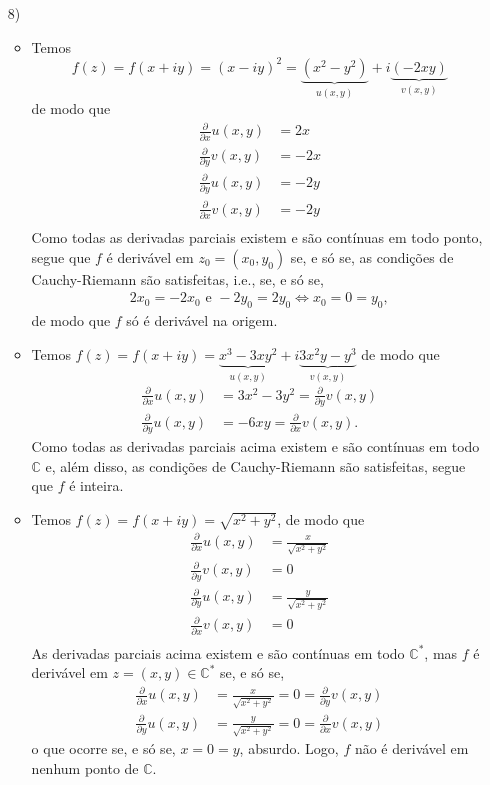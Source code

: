 \documentclass[12pt,a4paper]{article}
\begin{document}
\begin{enumerate}
	\item[8)]
	\begin{itemize}
		\item Temos
		$$
		f(z) = f(x+iy) = (x-iy)^2 = \underbrace{(x^2-y^2)}_{u(x,y)} + i\underbrace{(-2xy)}_{v(x,y)}
		$$
		de modo que
		\begin{align*}
		\frac{\partial}{\partial x}u(x,y) &= 2x \\  
		\frac{\partial}{\partial y}v(x,y) &= -2x \\
		\frac{\partial}{\partial y}u(x,y) &= -2y \\
		\frac{\partial}{\partial x}v(x,y) &= -2y \\
		\end{align*}
		Como todas as derivadas parciais existem e são contínuas em todo ponto, segue que $f$ é derivável em $z_0 = (x_0,y_0)$ se, e só se, as condições de Cauchy-Riemann são satisfeitas, i.e., se, e só se,
		\begin{align*}
		2x_0 = -2x_0 \text{ e } -2y_0=2y_0 \Longleftrightarrow x_0 = 0 = y_0,
		\end{align*}
		de modo que $f$ só é derivável na origem.
		
		\item Temos $f(z) = f(x+iy) = \underbrace{x^3-3xy^2}_{u(x,y)} + i\underbrace{3x^2y-y^3}_{v(x,y)}$
		de modo que
		\begin{align*}
		\frac{\partial}{\partial x}u(x,y) &= 3x^2 - 3y^2 = \frac{\partial}{\partial y}v(x,y) \\
		\frac{\partial}{\partial y}u(x,y) &= -6xy = \frac{\partial}{\partial x}v(x,y).
		\end{align*}
		Como todas as derivadas parciais acima existem e são contínuas em todo $\mathbb{C}$ e, além disso, as condições de Cauchy-Riemann são satisfeitas, segue que $f$ é inteira.
		
		\item Temos $f(z) = f(x+iy) = \sqrt{x^2+y^2}$, de modo que
		\begin{align*}
		\frac{\partial}{\partial x}u(x,y) &= \frac{x}{\sqrt{x^2+y^2}} \\  
		\frac{\partial}{\partial y}v(x,y) &= 0 \\
		\frac{\partial}{\partial y}u(x,y) &= \frac{y}{\sqrt{x^2+y^2}} \\
		\frac{\partial}{\partial x}v(x,y) &= 0 \\
		\end{align*}
		As derivadas parciais acima existem e são contínuas em todo $\mathbb{C}^*$, mas $f$ é derivável em $z = (x,y)\in\mathbb{C}^*$ se, e só se,
		\begin{align*}
		\frac{\partial}{\partial x}u(x,y) &= \frac{x}{\sqrt{x^2+y^2}}=0=\frac{\partial}{\partial y}v(x,y) \\
		\frac{\partial}{\partial y}u(x,y) &= \frac{y}{\sqrt{x^2+y^2}} =0=\frac{\partial}{\partial x}v(x,y)
		\end{align*}
		o que ocorre se, e só se, $x = 0 = y$, absurdo. Logo, $f$ não é derivável em nenhum ponto de $\mathbb{C}$.
\end{itemize}
	

\end{enumerate}
\end{document}
